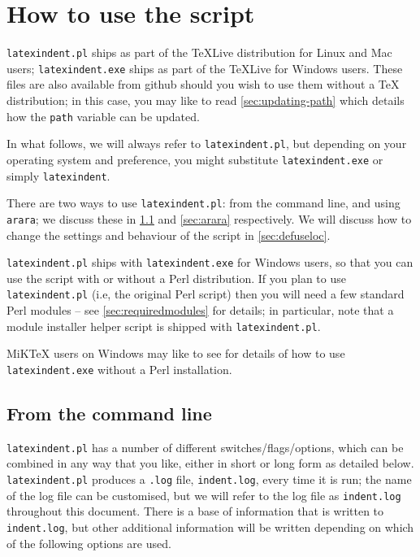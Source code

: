 \section{How to use the script}\label{sec:how:to:use}
 \texttt{latexindent.pl} ships as part of the \TeX Live distribution for
 Linux and Mac users; \texttt{latexindent.exe} ships as part of the \TeX Live for Windows
 users. These files are also available from github \cite{latexindent-home} should you wish
 to use them without a \TeX{} distribution; in this case, you may like to read
 \vref{sec:updating-path} which details how the \texttt{path} variable can be updated.

 In what follows, we will always refer to \texttt{latexindent.pl}, but depending on your
 operating system and preference, you might substitute \texttt{latexindent.exe} or simply
 \texttt{latexindent}.

 There are two ways to use \texttt{latexindent.pl}: from the command line, and using
 \texttt{arara}; we discuss these in \cref{sec:commandline} and \cref{sec:arara}
 respectively. We will discuss how to change the settings and behaviour of the script in
 \vref{sec:defuseloc}.

 \texttt{latexindent.pl} ships with \texttt{latexindent.exe} for Windows
 users, so that you can use the script with or without a Perl distribution. If you plan to
 use \texttt{latexindent.pl} (i.e, the original Perl script) then you will need a few
 standard Perl modules -- see \vref{sec:requiredmodules} for
 details;%
  in particular, note that a module installer helper script is shipped with
 \texttt{latexindent.pl}.

 MiKTeX users on Windows may like to see \cite{miktex-guide} for details of how to use
 \texttt{latexindent.exe} without a Perl installation. 

\subsection{From the command line}\label{sec:commandline}
	\texttt{latexindent.pl} has a number of different switches/flags/options, which
	can be combined in any way that you like, either in short or long form as detailed below.
	\texttt{latexindent.pl} produces a \texttt{.log} file, \texttt{indent.log}, every time it
	is run; the name of the log file can be customised, but we will refer to the log file as
	\texttt{indent.log} throughout this document. There is a base of information that is
	written to \texttt{indent.log}, but other additional information will be written
	depending on which of the following options are used.

